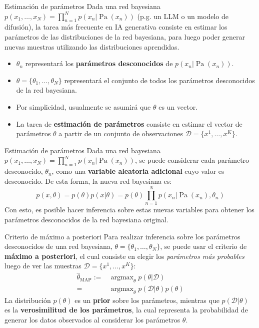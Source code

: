 \documentclass{beamer}
\newcommand{\argmax}{\operatorname{argmax}}
\begin{document}
\begin{frame}{Estimación de parámetros}
    Dada una red bayesiana $p(x_1,\ldots,x_N)=\prod_{n=1}^N p(x_n|\operatorname{Pa}(x_n))$ (p.g. un LLM o un modelo de difusión), la tarea más frecuente en IA generativa consiste en estimar los parámetros de las distribuciones de la red bayesiana, para luego poder generar nuevas muestras utilizando las distribuciones aprendidas.
    \begin{itemize}
        \item $\theta_n$ representará los \textbf{parámetros desconocidos} de $p(x_n|\operatorname{Pa}(x_n))$.
        \item $\theta=\{\theta_1,\ldots,\theta_N\}$ representará el conjunto de todos los parámetros desconocidos de la red bayesiana.
        \item Por simplicidad, usualmente se asumirá que $\theta$ es un vector.
        \item La tarea de \textbf{estimación de parámetros} consiste en estimar el vector de parámetros $\theta$ a partir de un conjunto de observaciones $\mathcal{D}=\{x^1,\ldots,x^K\}$.
    \end{itemize}
\end{frame}

\begin{frame}{Estimación de parámetros}
    Dada una red bayesiana $p(x_1,\ldots,x_N)=\prod_{n=1}^N p(x_n|\operatorname{Pa}(x_n))$, se puede considerar cada parámetro desconocido, $\theta_n$, como una \textbf{variable aleatoria adicional} cuyo valor es desconocido. De esta forma, la nueva red bayesiana es:
    \begin{equation*}
        p(x,\theta)=p(\theta)p(x|\theta)=p(\theta)\prod_{n=1}^N
        p(x_n|\operatorname{Pa}(x_n),\theta_n)
    \end{equation*}
    Con esto, es posible hacer inferencia sobre estas nuevas variables para obtener los parámetros desconocidos de la red bayesiana original.
\end{frame}

\begin{frame}{Criterio de máximo a posteriori}
    Para realizar inferencia sobre los parámetros desconocidos de una red bayesiana, $\theta=\{\theta_1,\ldots,\theta_N\}$, se puede usar el criterio de \textbf{máximo a posteriori}, el cual consiste en elegir los \textit{parámetros más probables} luego de ver las muestras $\mathcal{D}=\{x^1,\ldots,x^K\}$:
    \begin{align*}
        \hat\theta_{\text{MAP}}  :=&\argmax_\theta p(\theta|\mathcal{D})          \\
                                =&\argmax_\theta p(\mathcal{D}|\theta)p(\theta)
    \end{align*}
    La distribución $p(\theta)$ es un \textbf{prior} sobre los parámetros, mientras que $p(\mathcal{D}|\theta)$ es la \textbf{verosimilitud de los parámetros}, la cual representa la probabilidad de generar los datos observados al considerar los parámetros $\theta$.
\end{frame}
\end{document}
